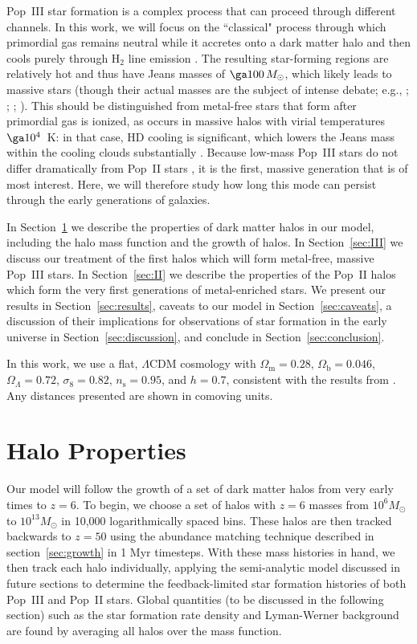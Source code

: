 \documentclass[a4paper,fleqn,usenatbib]{mnras}
\begin{document}
Pop~III star formation is a complex process that can proceed through different channels. In this work, we will focus on the ``classical" process through which primordial gas remains neutral while it accretes onto a dark matter halo and then cools purely through H$_2$ line emission \citep[][]{bromm_1999, abel_2002}. The resulting star-forming regions are relatively hot and thus have Jeans masses of $\ga 100 \, M_\odot$, which likely leads to massive stars (though their actual masses are the subject of intense debate; e.g., \citealt{bromm_1999}; \citealt{abel_2002}; \citealt{clark_2011}; \citealt{hirano_2017}). This should be distinguished from metal-free stars that form after primordial gas is ionized, as occurs in massive halos with virial temperatures $\ga 10^4$~K: in that case, HD cooling is significant, which lowers the Jeans mass within the cooling clouds substantially 
\citep[][]{oh_2002, johnson_2006}. Because low-mass Pop~III stars do not differ dramatically from Pop~II stars \citep[][]{tumlinson_2000}, it is the first, massive generation that is of most interest. 
Here, we will therefore study how long this mode can persist through the early generations of galaxies.

In Section~\ref{sec:properties} we describe the properties of dark matter halos in our model,
including the halo mass function and the growth of halos.  In Section~\ref{sec:III} we discuss our treatment of the first halos which will form 
metal-free, massive Pop~III stars. In Section~\ref{sec:II} we describe the properties of the Pop~II halos which form the very first generations of metal-enriched stars.  We present our results in Section~\ref{sec:results}, caveats to our model in Section~\ref{sec:caveats}, a discussion of their implications for observations of star formation in the early universe in 
Section~\ref{sec:discussion}, and conclude in Section~\ref{sec:conclusion}.

In this work, we use a flat, $\Lambda$CDM cosmology with $\Omega_\text{m} = 0.28$, $\Omega_\text{b} = 0.046$, $\Omega_\Lambda = 0.72$, $\sigma_8 = 0.82$, $n_\text{s} = 0.95$, and $h=0.7$, consistent with the results from \citet{planck}. Any distances presented are shown in comoving units.

\section{Halo Properties}
\label{sec:properties}

Our model will follow the growth of a set of dark matter halos from very early times to $z=6$. To begin, we choose a set of halos with $z=6$ masses from $10^6 M_\odot$ to $10^{13} M_\odot$ in 10,000 logarithmically spaced bins. These halos are then tracked backwards to $z=50$ using the abundance matching technique described in section~\ref{sec:growth} in 1 Myr timesteps. With these mass histories in hand, we then track each halo individually, applying the semi-analytic model discussed in future sections to determine the feedback-limited star formation histories of both Pop~III and Pop~II stars. Global quantities (to be discussed in the following section) such as the star formation rate density and Lyman-Werner background are found by averaging all halos over the mass function.
\end{document}

